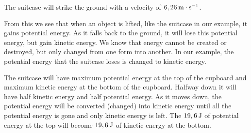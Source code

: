         
        \label{m38786*id69118}The suitcase will strike the ground with a velocity of \begin{math}6,26\phantom{\rule{2pt}{0ex}}\mathrm{m}\ensuremath{\cdot}\mathrm{s}{}^{-1}\end{math}.\par 
        \label{m38786*id69148}From this we see that when an object is lifted, like the suitcase in our example, it gains potential energy. As it falls back to the ground, it will lose this potential energy, but gain kinetic energy. We know that energy cannot be created or destroyed, but only changed from one form into another. In our example, the potential energy that the suitcase loses is changed to kinetic energy.\par 
        \label{m38786*id69157}The suitcase will have maximum potential energy at the top of the cupboard and maximum kinetic energy at the bottom of the cupboard. Halfway down it will have half kinetic energy and half potential energy. As it moves down, the potential energy will be converted (changed) into kinetic energy until all the potential energy is gone and only kinetic energy is left. The \begin{math}19,6\phantom{\rule{2pt}{0ex}}\mathrm{J}\end{math} of potential energy at the top will become \begin{math}19,6\phantom{\rule{2pt}{0ex}}\mathrm{J}\end{math} of kinetic energy at the bottom.\par 
\label{m38786*secfhsst!!!underscore!!!id1898}\vspace{.5cm} 
      
